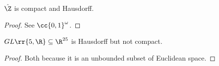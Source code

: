\documentclass{article}
\begin{document}
\begin{claim*}
  $\hat\Z$ is compact and Hausdorff.
  \begin{proof}
    See $\cc{0,1}^\omega$.
  \end{proof}
\end{claim*}

\begin{claim*}
  $GL\rr{5,\R}\subseteq\R^{25}$ is Hausdorff but not compact.
  \begin{proof}
    Both because it is an unbounded subset of Euclidean space.
  \end{proof}
\end{claim*}
\end{document}
